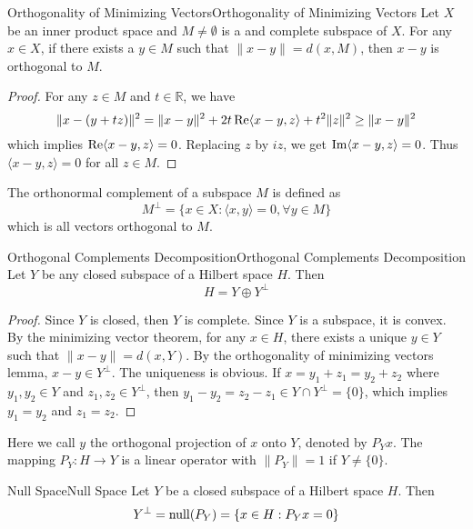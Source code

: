 \documentclass[../main.tex]{subfiles}
\begin{document}
\begin{lemma}{Orthogonality of Minimizing Vectors}{Orthogonality of Minimizing Vectors}
	Let $X$ be an inner product space and $M\neq \emptyset $ is a and complete subspace of $X$. For any $x\in X$, if there exists a $y\in M$ such that $\|x-y\| = d(x,M)$, then $x-y$ is orthogonal to $M$.
\end{lemma}
\begin{proof}
	For any $z\in M$ and $t\in \mathbb{R}$, we have
	\begin{equation*}
		\|x - (y + tz)\|^2 = \|x - y\|^2 + 2t \operatorname{Re} \langle x - y, z \rangle + t^2 \|z\|^2 \geq \|x - y\|^2
	\end{equation*}
	which implies $\operatorname{Re} \langle x - y, z \rangle = 0$. Replacing $z$ by $iz$, we get $\operatorname{Im} \langle x - y, z \rangle = 0$. Thus $\langle x - y, z \rangle = 0$ for all $z\in M$.
\end{proof}

The orthonormal complement of a subspace $M$ is defined as
\begin{equation}
	M^\perp = \{x\in X: \langle x, y \rangle = 0, \forall y\in M\}
\end{equation}
which is all vectors orthogonal to $M$.

\begin{theorem}{Orthogonal Complements Decomposition}{Orthogonal Complements Decomposition}
	Let $Y$ be any closed subspace of a Hilbert space $H$. Then
	\begin{equation}
		H = Y \oplus Y^\perp
	\end{equation}
\end{theorem}
\begin{proof}
	Since $Y$ is closed, then $Y$ is complete. Since $Y$ is a subspace, it is convex. By the minimizing vector theorem, for any $x\in H$, there exists a unique $y\in Y$ such that $\|x-y\| = d(x,Y)$. By the orthogonality of minimizing vectors lemma, $x-y \in Y^\perp$. The uniqueness is obvious. If $x=y_1 + z_1 = y_2 + z_2$ where $y_1,y_2\in Y$ and $z_1,z_2\in Y^\perp$, then $y_1 - y_2 = z_2 - z_1 \in Y \cap Y^\perp = \{0\}$, which implies $y_1 = y_2$ and $z_1 = z_2$.
\end{proof}

\begin{remark}
	Here we call $y$ the orthogonal projection of $x$ onto $Y$, denoted by $P_Y x$. The mapping $P_Y: H \to Y$ is a linear operator with $\|P_Y\| = 1$ if $Y \neq \{0\}$.
\end{remark}

\begin{lemma}{Null Space}{Null Space}
	Let $Y$ be a closed subspace of a Hilbert space $H$. Then
	\begin{equation}
		Y^\perp = \operatorname{null}(P_Y) = \{x\in H: P_Y x = 0\}
	\end{equation}
\end{lemma}
\end{document}
